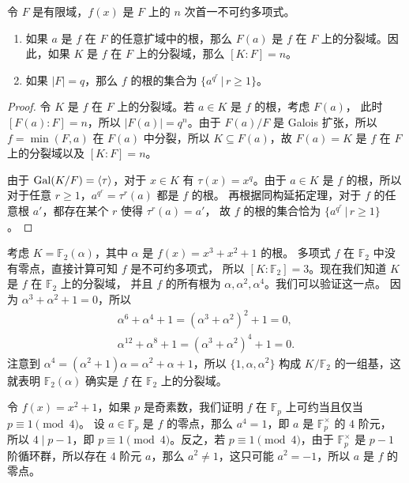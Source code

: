 \begin{corollary}
  令 $F$ 是有限域，$f(x)$ 是 $F$ 上的 $n$ 次首一不可约多项式。
  \begin{enumerate}
    \item 如果 $a$ 是 $f$ 在 $F$ 的任意扩域中的根，那么 $F(a)$ 是 $f$
    在 $F$ 上的分裂域。因此，如果 $K$ 是 $f$ 在 $F$ 上的分裂域，那么
    $[K:F]=n$。
    \item 如果 $|F|=q$，那么 $f$ 的根的集合为 $\big\{a^{q^r}\,|\, r\geq 1\big\}$。
  \end{enumerate}
\end{corollary}
\begin{proof}
  令 $K$ 是 $f$ 在 $F$ 上的分裂域。若 $a\in K$ 是 $f$ 的根，考虑 $F(a)$，
  此时 $[F(a):F]=n$，所以 $|F(a)|=q^n$。由于 $F(a)/F$ 是 Galois 扩张，所以 
  $f=\min(F,a)$ 在 $F(a)$ 中分裂，所以 $K\subseteq F(a)$，故 $F(a)=K$
  是 $f$ 在 $F$ 上的分裂域以及 $[K:F]=n$。

  由于 $\operatorname{Gal}(K/F)=\langle\tau\rangle$，对于 $x\in K$ 有 $\tau(x)=x^{q}$。由于 $a\in K$
  是 $f$ 的根，所以对于任意 $r\geq 1$，$a^{q^r}=\tau^r(a)$ 都是 $f$ 的根。
  再根据同构延拓定理，对于 $f$ 的任意根 $a'$，都存在某个 $r$ 使得 $\tau^r(a)=a'$，
  故 $f$ 的根的集合恰为 $\big\{a^{q^r}\,|\, r\geq 1\big\}$。
\end{proof}

\begin{example}
  考虑 $K=\mathbb{F}_2(\alpha)$，其中 $\alpha$ 是 $f(x)=x^3+x^2+1$ 的根。
  多项式 $f$ 在 $\mathbb{F}_2$ 中没有零点，直接计算可知 $f$ 是不可约多项式，
  所以 $[K:\mathbb{F}_2]=3$。现在我们知道 $K$ 是 $f$ 在 $\mathbb{F}_2$ 上的分裂域，
  并且 $f$ 的所有根为 $\alpha,\alpha^2,\alpha^4$。我们可以验证这一点。
  因为 $\alpha^3+\alpha^2+1=0$，所以 
  \begin{gather*}
    \alpha^6+\alpha^4+1=(\alpha^3+\alpha^2)^2+1=0,\\
    \alpha^{12}+\alpha^8+1=(\alpha^3+\alpha^2)^4+1=0.
  \end{gather*}
  注意到 $\alpha^4=(\alpha^2+1)\alpha=\alpha^2+\alpha+1$，所以 
  $\{1,\alpha,\alpha^2\}$ 构成 $K/\mathbb{F}_2$ 的一组基，这就表明 $\mathbb{F}_2(\alpha)$
  确实是 $f$ 在 $\mathbb{F}_2$ 上的分裂域。
\end{example}

\begin{example}
  令 $f(x)=x^2+1$，如果 $p$ 是奇素数，我们证明 $f$ 在 $\mathbb{F}_p$ 上可约当且仅当 $p\equiv 1\pmod 4$。
  设 $a\in \mathbb{F}_p$ 是 $f$ 的零点，那么 $a^4=1$，即 $a$ 是 $\mathbb{F}_p^\times$ 的 $4$ 阶元，
  所以 $4\mid p-1$，即 $p\equiv 1\pmod 4$。反之，若 $p\equiv 1\pmod 4$，由于 $\mathbb{F}_p^\times$
  是 $p-1$ 阶循环群，所以存在 $4$ 阶元 $a$，那么 $a^2\neq 1$，这只可能 $a^2=-1$，所以 $a$
  是 $f$ 的零点。
\end{example}






